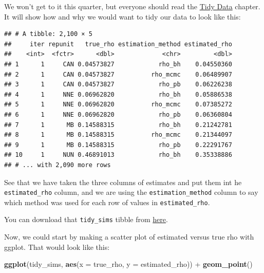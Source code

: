 \documentclass[]{book}
\newenvironment{Shaded}{\begin{snugshade}}{\end{snugshade}}
\newcommand{\KeywordTok}[1]{\textcolor[rgb]{0.13,0.29,0.53}{\textbf{{#1}}}}
\newcommand{\DataTypeTok}[1]{\textcolor[rgb]{0.13,0.29,0.53}{{#1}}}
\newcommand{\StringTok}[1]{\textcolor[rgb]{0.31,0.60,0.02}{{#1}}}
\newcommand{\CommentTok}[1]{\textcolor[rgb]{0.56,0.35,0.01}{\textit{{#1}}}}
\newcommand{\NormalTok}[1]{{#1}}
\theoremstyle{definition}
\theoremstyle{definition}
\theoremstyle{remark}
\begin{document}
We won't get to it this quarter, but everyone should read the
\href{http://r4ds.had.co.nz/tidy-data.html}{Tidy Data} chapter. It will
show how and why we would want to tidy our data to look like this:

\begin{Shaded}
\end{Shaded}

\begin{verbatim}
## # A tibble: 2,100 × 5
##     iter repunit   true_rho estimation_method estimated_rho
##    <int>  <fctr>      <dbl>             <chr>         <dbl>
## 1      1     CAN 0.04573827            rho_bh    0.04550360
## 2      1     CAN 0.04573827          rho_mcmc    0.06489907
## 3      1     CAN 0.04573827            rho_pb    0.06226238
## 4      1     NNE 0.06962820            rho_bh    0.05886538
## 5      1     NNE 0.06962820          rho_mcmc    0.07385272
## 6      1     NNE 0.06962820            rho_pb    0.06360804
## 7      1      MB 0.14588315            rho_bh    0.21242781
## 8      1      MB 0.14588315          rho_mcmc    0.21344097
## 9      1      MB 0.14588315            rho_pb    0.22291767
## 10     1     NUN 0.46891013            rho_bh    0.35338886
## # ... with 2,090 more rows
\end{verbatim}

See that we have taken the three columns of estimates and put them int
he \texttt{estimated\_rho} column, and we are using the
\texttt{estimation\_method} column to say which method was used for each
row of values in \texttt{estimated\_rho}.

You can download that \texttt{tidy\_sims} tibble from
\href{https://www.dropbox.com/s/4uniolfszui6av7/tidy_sims.rds?dl=1}{here}.

Now, we could start by making a scatter plot of estimated versus true
rho with ggplot. That would look like this:

\begin{Shaded}
\begin{Highlighting}[]
\KeywordTok{ggplot}\NormalTok{(tidy_sims, }\KeywordTok{aes}\NormalTok{(}\DataTypeTok{x =} \NormalTok{true_rho, }\DataTypeTok{y =} \NormalTok{estimated_rho)) +}
\StringTok{  }\KeywordTok{geom_point}\NormalTok{()}
\end{Highlighting}
\end{Shaded}
\end{document}
